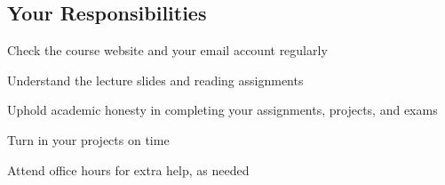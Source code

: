 
\subsection*{Your Responsibilities}

\begin{outline}

\1 Check the course website and your email account regularly

\1 Understand the lecture slides and reading assignments

\1 Uphold academic honesty in completing your assignments, projects, and exams

\1 Turn in your projects on time

\1 Attend office hours for extra help, as needed
	 
\end{outline}